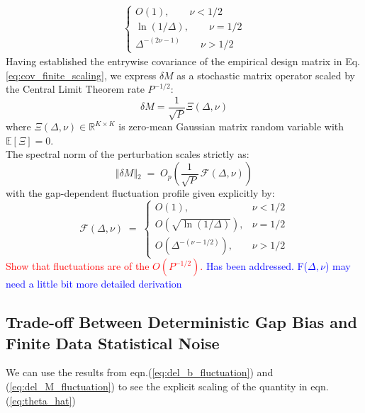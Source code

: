 \documentclass[11pt,a4paper]{article}
\theoremstyle{remark}
\newcommand{\del}{\delta}
\def\sgp#1{{\sf\textcolor{red}{#1}}}
\def\ant#1{{\sf\textcolor{blue}{#1}}}
\begin{document}
\begin{onehalfspace}
\begin{align}
\begin{cases}
 O(1), \qquad \nu<1/2 \\
 \ln(1/\Delta), \qquad \nu=1/2\\
 \Delta^{-(2\nu-1)}\qquad \nu>1/2
 \end{cases}\label{eq:cov_finite_scaling}
\end{align}
Having established the entrywise covariance of the empirical design matrix in Eq.\ref{eq:cov_finite_scaling}, we express $\del M$ as a stochastic matrix operator scaled by the Central Limit Theorem rate $P^{-1/2}$:
\begin{equation}
    \del M = \frac{1}{\sqrt{P}}\Xi(\Delta, \nu)
\end{equation}
where $\Xi(\Delta, \nu) \in \mathbb{R}^{K\times K}$ is zero-mean Gaussian matrix random variable with $\mathbb{E}[\Xi] = 0$.\\
The spectral norm of the perturbation scales strictly as:
\begin{equation}
    \Vert{}\delta M\Vert{}_2 \;=\; O_p\left( \frac{1}{\sqrt{P}} \, \mathcal{F}(\Delta, \nu) \right)
\end{equation}
with the gap-dependent fluctuation profile given explicitly by:
\begin{equation}\label{eq:del_M_fluctuation}
    \mathcal{F}(\Delta, \nu) \;=\; \begin{cases}   O(1), & \nu < 1/2 \\   O\left(\sqrt{\ln(1/\Delta)}\right), & \nu = 1/2 \\   O\left(\Delta^{-(\nu - 1/2)}\right), & \nu > 1/2  \end{cases}
\end{equation}
\sgp{Show that fluctuations are of the $O(P^{-1/2})$.}
\ant{Has been addressed. F($\Delta,\nu$) may need a little bit more detailed derivation}
\subsection{Trade-off Between Deterministic Gap Bias and Finite Data Statistical Noise}\label{subsec:theta_scaling}
We can use the results from eqn.(\ref{eq:del_b_fluctuation}) and (\ref{eq:del_M_fluctuation}) to see the explicit scaling of the quantity in eqn.(\ref{eq:theta_hat})


\end{onehalfspace}
\end{document}
